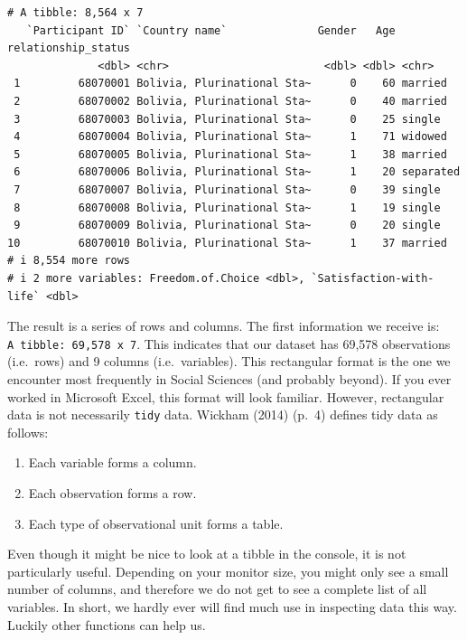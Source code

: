 \documentclass[
  letterpaper,
]{krantz}
\providecommand{\tightlist}{%
  \setlength{\itemsep}{0pt}\setlength{\parskip}{0pt}}\usepackage{longtable,booktabs,array}
\renewenvironment{quote}{\begin{VF}}{\end{VF}}
\begin{document}
\begin{verbatim}
# A tibble: 8,564 x 7
   `Participant ID` `Country name`              Gender   Age relationship_status
              <dbl> <chr>                        <dbl> <dbl> <chr>              
 1         68070001 Bolivia, Plurinational Sta~      0    60 married            
 2         68070002 Bolivia, Plurinational Sta~      0    40 married            
 3         68070003 Bolivia, Plurinational Sta~      0    25 single             
 4         68070004 Bolivia, Plurinational Sta~      1    71 widowed            
 5         68070005 Bolivia, Plurinational Sta~      1    38 married            
 6         68070006 Bolivia, Plurinational Sta~      1    20 separated          
 7         68070007 Bolivia, Plurinational Sta~      0    39 single             
 8         68070008 Bolivia, Plurinational Sta~      1    19 single             
 9         68070009 Bolivia, Plurinational Sta~      0    20 single             
10         68070010 Bolivia, Plurinational Sta~      1    37 married            
# i 8,554 more rows
# i 2 more variables: Freedom.of.Choice <dbl>, `Satisfaction-with-life` <dbl>
\end{verbatim}

The result is a series of rows and columns. The first information we
receive is: \texttt{A\ tibble:\ 69,578\ x\ 7}. This indicates that our
dataset has 69,578 observations (i.e.~rows) and 9 columns
(i.e.~variables). This rectangular format is the one we encounter most
frequently in Social Sciences (and probably beyond). If you ever worked
in Microsoft Excel, this format will look familiar. However, rectangular
data is not necessarily \texttt{tidy} data. Wickham (2014) (p.~4)
defines tidy data as follows:

\begin{quote}
\begin{enumerate}
\def\labelenumi{\arabic{enumi}.}
\tightlist
\item
  Each variable forms a column.
\item
  Each observation forms a row.
\item
  Each type of observational unit forms a table.
\end{enumerate}
\end{quote}

Even though it might be nice to look at a tibble in the console, it is
not particularly useful. Depending on your monitor size, you might only
see a small number of columns, and therefore we do not get to see a
complete list of all variables. In short, we hardly ever will find much
use in inspecting data this way. Luckily other functions can help us.
\end{document}
